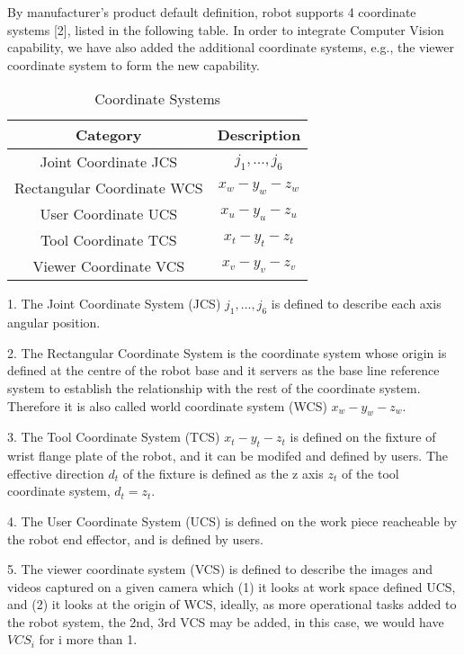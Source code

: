 \documentclass[conference]{IEEEtran}
\begin{document}
By manufacturer's product default definition, 
robot supports 4 coordinate systems [2],
listed in the following table. In order to 
integrate Computer Vision capability, we have 
also added the additional coordinate systems, e.g., the 
viewer coordinate system to form the new capability. 
\begin{table}[H] %
\renewcommand{\arraystretch}{1.3} 
\caption{Coordinate Systems}
\label{state-Table1}
\centering 
\begin{tabular}{|c||c|}
\hline
Category         & Description   \\
\hline
\hline
Joint Coordinate JCS & $j_1,...,j_6$ \\
\hline
Rectangular Coordinate WCS & $x_w-y_w-z_w$ \\
\hline
User Coordinate UCS & $x_u-y_u-z_u$ \\
\hline
Tool Coordinate TCS & $x_t-y_t-z_t$ \\
\hline
\hline 
Viewer Coordinate VCS & $x_v-y_v-z_v$ \\
\hline
\end{tabular}
\end{table}


1. The Joint Coordinate System (JCS) $j_1,...,j_6$
is defined to describe each axis 
angular position.  

2. The Rectangular Coordinate System is the coordinate system 
whose origin is defined at the centre of the robot
base and it servers as the base line reference system 
to establish the relationship with the rest of the 
coordinate system. Therefore it is also called 
world coordinate system (WCS) $x_w-y_w-z_w$. 

3. The Tool Coordinate System (TCS) $x_t-y_t-z_t$  
is defined on the fixture of wrist flange plate of the robot, and
it can be modifed and defined by users. The effective direction 
$d_t$ of the fixture is defined as the z axis $z_t$ of the tool coordinate system,
$d_t = z_t$. 

4. The User Coordinate System (UCS) is defined on the work piece 
reacheable by the robot end effector, and is defined by users.

5. The viewer coordinate system (VCS) is defined to describe the 
images and videos captured on a given camera which (1) it 
looks at work space defined UCS, and (2) it looks at the 
origin of WCS, ideally, as more operational tasks added to 
the robot system, the 2nd, 3rd VCS may be added, in this case, 
we would have $VCS_i$ for i more than 1. 
\end{document}

